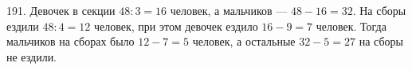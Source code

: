 191. Девочек в секции $48:3=16$ человек, а мальчиков --- $48-16=32.$ На сборы ездили $48:4=12$ человек, при этом девочек ездило $16-9=7$ человек. Тогда мальчиков на сборах было $12-7=5$ человек, а остальные $32-5=27$ на сборы не ездили.\\
